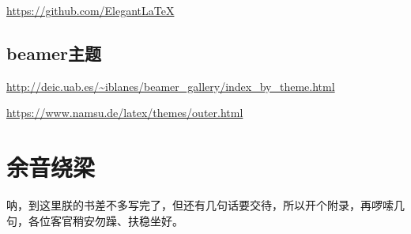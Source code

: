 \documentclass[]{ctexbook}
\begin{document}
\url{https://github.com/ElegantLaTeX}

\hypertarget{beamer}{%
\section{beamer主题}\label{beamer}}

\url{http://deic.uab.es/~iblanes/beamer_gallery/index_by_theme.html}

\url{https://www.namsu.de/latex/themes/outer.html}

\cleardoublepage

\hypertarget{appendix-}{%
\appendix {}}


\hypertarget{sound}{%
\chapter{余音绕梁}\label{sound}}

呐，到这里朕的书差不多写完了，但还有几句话要交待，所以开个附录，再啰嗦几句，各位客官稍安勿躁、扶稳坐好。



\backmatter
\printindex
\end{document}
